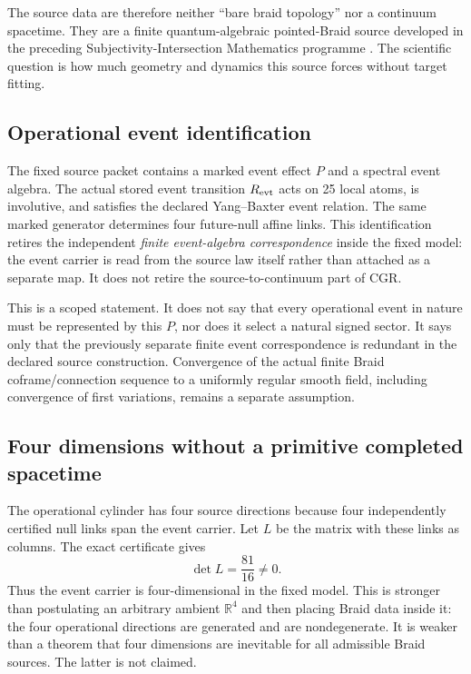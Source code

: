 \documentclass[11pt]{article}
\theoremstyle{definition}
\theoremstyle{remark}
\begin{document}
The source data are therefore neither ``bare braid topology'' \cite{artin1947} nor a continuum spacetime. They are a finite quantum-algebraic pointed-Braid source developed in the preceding Subjectivity-Intersection Mathematics programme \cite{watanabe2026braid,watanabe2026ontology}. The scientific question is how much geometry and dynamics this source forces without target fitting.

\subsection{Operational event identification}

The fixed source packet contains a marked event effect $P$ and a spectral event algebra. The actual stored event transition $R_{\rm evt}$ acts on 25 local atoms, is involutive, and satisfies the declared Yang--Baxter event relation. The same marked generator determines four future-null affine links. This identification retires the independent \emph{finite event-algebra correspondence} inside the fixed model: the event carrier is read from the source law itself rather than attached as a separate map. It does not retire the source-to-continuum part of CGR.

This is a scoped statement. It does not say that every operational event in nature must be represented by this $P$, nor does it select a natural signed sector. It says only that the previously separate finite event correspondence is redundant in the declared source construction. Convergence of the actual finite Braid coframe/connection sequence to a uniformly regular smooth field, including convergence of first variations, remains a separate assumption.

\subsection{Four dimensions without a primitive completed spacetime}

The operational cylinder has four source directions because four independently certified null links span the event carrier. Let $L$ be the matrix with these links as columns. The exact certificate gives
\begin{equation}
 \det L=\frac{81}{16}\neq0.
\end{equation}
Thus the event carrier is four-dimensional in the fixed model. This is stronger than postulating an arbitrary ambient $\mathbb R^4$ and then placing Braid data inside it: the four operational directions are generated and are nondegenerate. It is weaker than a theorem that four dimensions are inevitable for all admissible Braid sources. The latter is not claimed.
\end{document}
